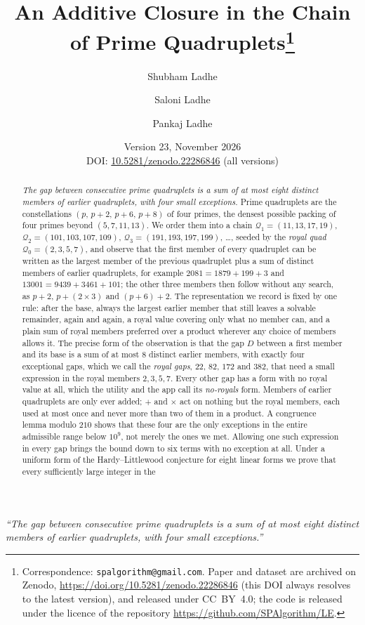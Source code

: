 \documentclass[11pt,a4paper]{article}
\title{An Additive Closure in the Chain of Prime Quadruplets\thanks{Correspondence:
\texttt{spalgorithm@gmail.com}. Paper and dataset are archived on Zenodo,
\url{https://doi.org/10.5281/zenodo.22286846} (this DOI always
resolves to the latest version), and released under
CC~BY~4.0; the code is released under the licence of the repository
\url{https://github.com/SPAlgorithm/LE}.}}
\author{Shubham Ladhe \and Saloni Ladhe \and Pankaj Ladhe}
\date{Version 23, November 2026\\[2pt] {\small DOI: \href{https://doi.org/10.5281/zenodo.22286846}{10.5281/zenodo.22286846}
(all versions)}}
\newcommand{\Q}{\mathcal{Q}}
\begin{document}
\maketitle

\begin{center}
\large\itshape ``The gap between consecutive prime quadruplets is a sum of at most eight distinct members of earlier quadruplets, with four small exceptions.''
\end{center}

\begin{abstract}
\emph{The gap between consecutive prime quadruplets is a sum of at most eight distinct members of earlier quadruplets, with four small exceptions.}
Prime quadruplets are the constellations $(p,\,p+2,\,p+6,\,p+8)$ of four
primes, the densest possible packing of four primes beyond $(5,7,11,13)$.
We order them into a chain $\Q_1=(11,13,17,19)$, $\Q_2=(101,103,107,109)$,
$\Q_3=(191,193,197,199)$, \dots, seeded by the \emph{royal quad}
$\Q_0=(2,3,5,7)$, and observe that the first member of every quadruplet can
be written as the largest member of the previous quadruplet plus a sum of
distinct members of earlier quadruplets, for example
$2081 = 1879 + 199 + 3$ and
$13001 = 9439 + 3461 + 101$; the other three
members then follow without any search, as $p+2$, $p+(2\times3)$ and
$(p+6)+2$. The representation we record is fixed by one rule: after the
base, always the largest earlier member that still leaves a solvable
remainder, again and again, a royal value covering only what no member
can, and a plain sum of royal members preferred over a product wherever
any choice of members allows it.
The precise form of the observation is that the gap $D$ between a
first member and its base is a sum of at most $8$ distinct earlier
members, with exactly four exceptional gaps, which we call the \emph{royal
gaps}, $22$, $82$, $172$ and $382$,
that need a small expression in the royal members $2,3,5,7$. Every other gap has a form with no royal value at all, which the utility and the app call its \emph{no-royals} form. Members of
earlier quadruplets are only ever added; $+$ and $\times$ act on nothing
but the royal members, each used at most once and never more than two of
them in a product. A congruence lemma modulo $210$ shows that these four
are the only exceptions in the entire admissible range below $10^9$, not
merely the ones we met. Allowing
one such expression in every gap brings the bound down to six terms with no
exception at all. Under a uniform form of the Hardy--Littlewood conjecture
for eight linear forms we prove that every sufficiently large integer in the

\end{abstract}
\end{document}
